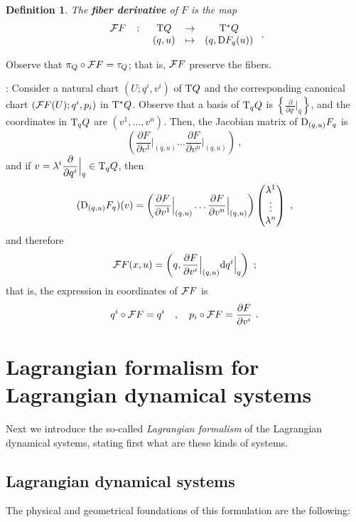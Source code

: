 \documentclass[12pt]{report}
\newtheorem{definition}[teor]{Definition}
\def\dst{\displaystyle}
\def\derpar#1#2{\frac{\partial{#1}}{\partial{#2}}}
\def\d{{\rm d}}
\def\Tan{{\rm T}}
\begin{document}
\begin{definition}
The \textbf{fiber derivative} of $F$ is the map
$$
\begin{array}{ccccc}
{\cal F}F & \colon & \Tan Q & \to & \Tan^*Q
\\
 & & (q,u) & \mapsto & (q,{\rm D}F_q(u))
\end{array} \ .
$$
\end{definition}

Observe that $\pi_Q \circ{\cal F}F = \tau_Q$;
that is, ${\cal F}F$ preserve the fibers.

:
Consider a natural chart $(U;q^i,v^i)$ of $\Tan Q$
and the corresponding canonical chart $({\cal F}F(U);q^i,p_i)$ in $\Tan^* Q$.
Observe that a basis of $\Tan_qQ$ is
\(\dst \left\{ \derpar{}{q^i}\Big\vert_q\right\} \),
and the coordinates in $\Tan_qQ$ are $(v^1,\ldots ,v^n)$.
Then, the Jacobian matrix of ${\rm D}_{(q,u )}F_q$ is
$$
\left( \derpar{F}{v^1}\Big\vert_{(q,u)} \ldots
\derpar{F}{v^n}\Big\vert_{(q,u)} \right) \ ,
$$
and if  \(\dst v=\lambda^i\derpar{}{q^i}\Big\vert_q \in \Tan_qQ\), then
$$
({\rm D}_{(q,u)}F_q)(v) =
\left( \derpar{F}{v^1}\Big\vert_{(q,u)} \ldots
\derpar{F}{v^n}\Big\vert_{(q,u)} \right)
\left(\begin{matrix}\lambda^1 \\ \vdots \\ \lambda^n \end{matrix}\right)\ ,
$$
and therefore
$$
 {\cal F}F(x,u) = \left( q,\derpar{F}{v^i}\Big\vert_{(q,u)}\d q^i
\Big\vert_q\right) \ ;
$$
that is, the expression in coordinates of ${\cal F}F$ is
$$
q^i \circ{\cal F}F = q^i \quad , \quad p_i \circ{\cal F}F =\derpar{F}{v^i}
\ .
$$


\section{Lagrangian formalism for Lagrangian dynamical systems}


Next we introduce the so-called {\sl Lagrangian formalism} of the
Lagrangian dynamical systems,
stating first what are these kinds of systems.


\subsection{Lagrangian dynamical systems}
\label{poslagdyn}


The physical and geometrical foundations of this formulation are the following:
\end{document}

